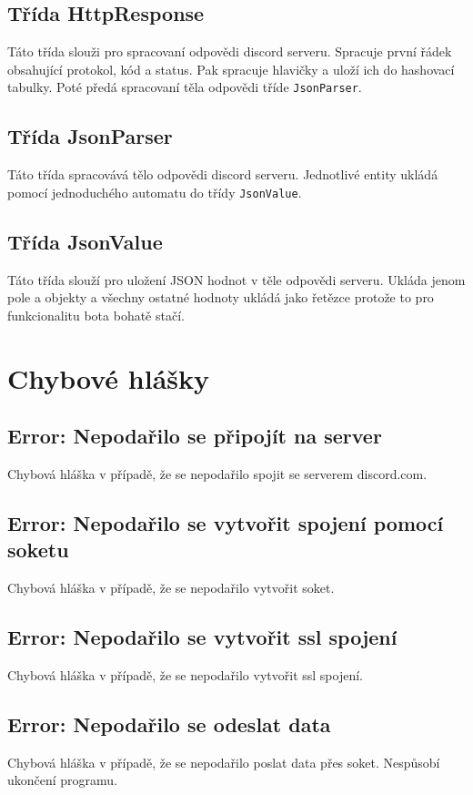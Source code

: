 \documentclass[a4paper,11pt]{article}
\begin{document}
\subsection{Třída HttpResponse}
Táto třída slouži pro spracovaní odpovědi discord serveru. Spracuje první řádek obsahující protokol, kód a status.
Pak spracuje hlavičky a uloží ich do hashovací tabulky. Poté předá spracovaní těla odpovědi tříde \texttt{JsonParser}.

\subsection{Třída JsonParser}
Táto třída spracovává tělo odpovědi discord serveru. Jednotlivé entity ukládá pomocí jednoduchého automatu do třídy \texttt{JsonValue}.

\subsection{Třída JsonValue}
Táto třída slouží pro uložení JSON hodnot v těle odpovědi serveru. Ukláda jenom pole a objekty a všechny ostatné hodnoty ukládá jako řetězce protože to pro funkcionalitu bota bohatě stačí.

\section{Chybové hlášky}
\subsection{Error: Nepodařilo se připojít na server}
Chybová hláška v případě, že se nepodařilo spojit se serverem discord.com.

\subsection{Error: Nepodařilo se vytvořit spojení pomocí soketu}
Chybová hláška v případě, že se nepodařilo vytvořit soket.

\subsection{Error: Nepodařilo se vytvořit ssl spojení}
Chybová hláška v případě, že se nepodařilo vytvořit ssl spojení.

\subsection{Error: Nepodařilo se odeslat data}
Chybová hláška v případě, že se nepodařilo poslat data přes soket. Nespůsobí ukončení programu.
\end{document}
